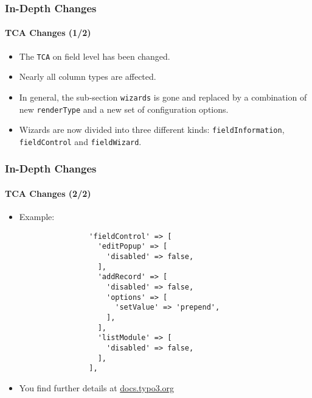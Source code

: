 \begin{frame}[fragile]
	\frametitle{In-Depth Changes}
	\framesubtitle{TCA Changes (1/2)}

	\begin{itemize}

		\item The \texttt{TCA} on field level has been changed.

		\item Nearly all column types are affected.

		\item In general, the sub-section \texttt{wizards} is gone and replaced by a combination of new
			\texttt{renderType} and a new set of configuration options.

		\item Wizards are now divided into three different kinds: \texttt{fieldInformation}, \texttt{fieldControl}
			and \texttt{fieldWizard}.

	\end{itemize}

\end{frame}

\begin{frame}[fragile]
	\frametitle{In-Depth Changes}
	\framesubtitle{TCA Changes (2/2)}

	\lstset{basicstyle=\tiny\ttfamily}

	\begin{itemize}
		\item Example:

			\begin{lstlisting}
				'fieldControl' => [
				  'editPopup' => [
				    'disabled' => false,
				  ],
				  'addRecord' => [
				    'disabled' => false,
				    'options' => [
				      'setValue' => 'prepend',
				    ],
				  ],
				  'listModule' => [
				    'disabled' => false,
				  ],
				],
			\end{lstlisting}

		\item You find further details at
			\href{https://docs.typo3.org/typo3cms/extensions/core/8-dev/singlehtml/Index.html#deprecation-79440-formengine-element-expansion}{docs.typo3.org}

	\end{itemize}

\end{frame}


